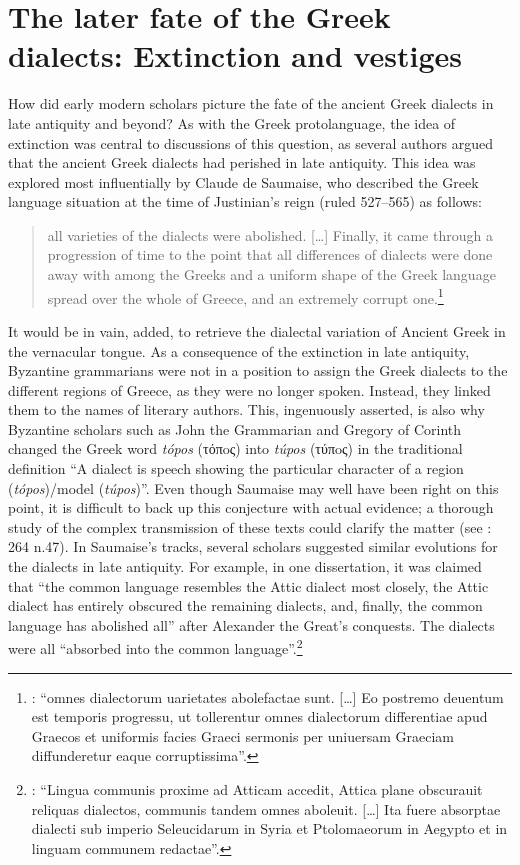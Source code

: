 \section{The later fate of the Greek dialects: Extinction and vestiges}\label{sec:5.5}

How did early modern scholars picture the fate of the ancient Greek dialects in late antiquity and beyond? As with the Greek protolanguage, the idea of extinction was central to discussions of this question, as several authors argued that the ancient Greek dialects had perished in late antiquity. This idea was explored most influentially by Claude de Saumaise, who described the Greek language situation at the time of Justinian’s reign (ruled 527–565) as follows:

\begin{quote}
all varieties of the dialects were abolished. […] Finally, it came through a progression of time to the point that all differences of dialects were done away with among the Greeks and a uniform shape of the Greek language spread over the whole of Greece, and an extremely corrupt one.\footnote{\citet[446--447]{Saumaise1643a}: “omnes dialectorum uarietates abolefactae sunt. […] Eo postremo deuentum est temporis progressu, ut tollerentur omnes dialectorum differentiae apud Graecos et uniformis facies Graeci sermonis per uniuersam Graeciam diffunderetur eaque corruptissima”.}
\end{quote}

It would be in vain, \citet[447–449]{Saumaise1643a} added, to retrieve the dialectal variation of Ancient Greek in the vernacular tongue. As a consequence of the extinction in late antiquity, Byzantine grammarians were not in a position to assign the Greek dialects to the different regions of Greece, as they were no longer spoken. Instead, they linked them to the names of literary authors. This, \citet[450, 453–455]{Saumaise1643a} ingenuously asserted, is also why Byzantine scholars such as John the Grammarian and Gregory of Corinth changed the Greek word \textit{tópos} (τόπoς) into \textit{túpos} (τύπoς) in the traditional definition “A dialect is speech showing the particular character of a region (\textit{tópos})/model (\textit{túpos})”. Even though Saumaise may well have been right on this point, it is difficult to back up this conjecture with actual evidence; a thorough study of the complex transmission of these texts could clarify the matter (see \citealt{VanRooy2016d}: 264 n.47). In Saumaise’s tracks, several scholars suggested similar evolutions for the dialects in late antiquity. For example, in one dissertation, it was claimed that “the common language resembles the Attic dialect most closely, the Attic dialect has entirely obscured the remaining dialects, and, finally, the common language has abolished all” after Alexander the Great’s conquests. The dialects were all “absorbed into the common language”.\footnote{\citet[\textsc{a.5}\textsc{\textsuperscript{r}}]{Schorling1678}: “Lingua communis proxime ad Atticam accedit, Attica plane obscurauit reliquas dialectos, communis tandem omnes aboleuit. […] Ita fuere absorptae dialecti sub imperio Seleucidarum in Syria et Ptolomaeorum in Aegypto et in linguam communem redactae”.}

